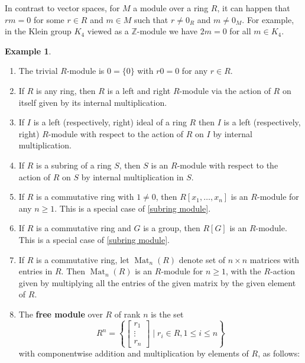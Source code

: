 \documentclass[12pt]{report}
\numberwithin{equation}{section}
\numberwithin{theorem}{chapter}
\theoremstyle{definition}
\newtheorem{example}[theorem]{Example}
\newtheorem*{basic properties}{Basic Properties}
\newtheorem*{Important Remark}{Important Remark}
\newcommand{\df}[1]{{\bf #1}\index{#1}}
\newcommand{\Z}{\mathbb{Z}}
\DeclareMathOperator{\M}{Mat}
\begin{document}
In contrast to vector spaces, for $M$ a module over a ring $R$, it can happen that $rm=0$ for some $r \in R$ and $m \in M$ such that $r \neq 0_R$ and $m \neq 0_M$. For example, in the Klein group $K_4$ viewed as a $\Z$-module we have $2m=0$ for all $m \in K_4$.


\begin{example}
\begin{enumerate}[label=(\arabic*)]
\item The trivial $R$-module is $0=\{0\}$ with $r0=0$ for any $r\in R$.
\item If $R$ is any ring, then $R$ is a left and right $R$-module via the action of $R$ on itself given by its internal multiplication.
\item If $I$ is a left (respectively, right) ideal of a ring $R$ then $I$ is a left (respectively, right) $R$-module with respect to the action of $R$ on $I$ by internal multiplication. 
\item\label{subring module} If $R$ is a subring of a ring $S$, then $S$ is an $R$-module with respect to the action of $R$ on $S$ by internal multiplication in $S$.
\item If $R$ is a commutative ring with $1 \neq 0$, then $R[x_1,\ldots,x_n]$ is an $R$-module for any $n \geqslant 1$. This is a special case of \ref{subring module}.
\item If $R$ is a commutative ring and $G$ is a group, then $R[G]$ is an $R$-module. This is a special case of \ref{subring module}.
\item If $R$ is a commutative ring, let $\M_n(R)$ denote set of $n \times n$ matrices with entries in $R$. Then $\M_n(R)$ is an $R$-module for $n\geqslant 1$, with the $R$-action given by multiplying all the entries of the given matrix by the given element of $R$.
\item The \df{free module} over $R$ of rank $n$ is the set
$$R^n=\left\{\begin{bmatrix} r_1\\ \vdots\\r_n \end{bmatrix} \mid r_i\in R, 1 \leqslant i \leqslant n\right\}$$
with componentwise addition and multiplication by elements of $R$, as follows:

\end{enumerate}
\end{example}
\end{document}

